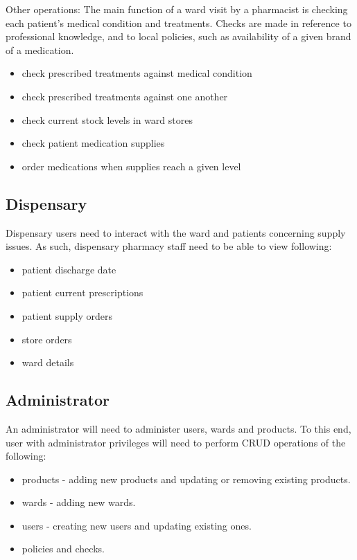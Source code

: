 \documentclass[letterpaper]{amsart}
\begin{document}
Other operations:
The main function of a ward visit by a pharmacist is checking each patient's medical condition and treatments.  Checks are made in reference to professional knowledge, and to local policies, such as availability of a given brand of a medication.
\begin{itemize}
    \item check prescribed treatments against medical condition
    \item check prescribed treatments against one another
    \item check current stock levels in ward stores 
    \item check patient medication supplies 
    \item order medications when supplies reach a given level
\end{itemize}
\subsection{Dispensary}
Dispensary users need to interact with the ward and patients concerning supply issues.  As such, dispensary pharmacy staff need to be able to view following:
\begin{itemize} 
    \item patient discharge date 
    \item patient current prescriptions
    \item patient supply orders 
    \item store orders 
    \item ward details 
\end{itemize}

\subsection{Administrator}
An administrator will need to administer users, wards and products.  To this end, user with administrator privileges will need to perform CRUD operations of the following:
\begin{itemize}
    \item products - adding new products and updating or removing existing products.
    \item wards - adding new wards.
    \item users - creating new users and updating existing ones.
    \item policies and checks.
\end{itemize}
\end{document}

